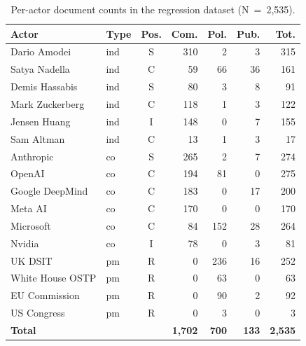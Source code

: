 \documentclass[11pt,a4paper,twocolumn]{article}
\begin{document}
\begin{table}[h]
\centering
\caption{Per-actor document counts in the regression dataset (N~=~2,535).}
\label{tab:actors}
\small
\setlength{\tabcolsep}{3.5pt}
\begin{tabular}{llcrrrr}
\toprule
\textbf{Actor} & \textbf{Type} & \textbf{Pos.} &
  \textbf{Com.} & \textbf{Pol.} & \textbf{Pub.} & \textbf{Tot.} \\
\midrule
Dario Amodei    & ind & S & 310 &   2 &  3 & 315 \\
Satya Nadella   & ind & C &  59 &  66 & 36 & 161 \\
Demis Hassabis  & ind & S &  80 &   3 &  8 &  91 \\
Mark Zuckerberg & ind & C & 118 &   1 &  3 & 122 \\
Jensen Huang    & ind & I & 148 &   0 &  7 & 155 \\
Sam Altman      & ind & C &  13 &   1 &  3 &  17 \\
\midrule
Anthropic       & co  & S & 265 &   2 &  7 & 274 \\
OpenAI          & co  & C & 194 &  81 &  0 & 275 \\
Google DeepMind & co  & C & 183 &   0 & 17 & 200 \\
Meta AI         & co  & C & 170 &   0 &  0 & 170 \\
Microsoft       & co  & C &  84 & 152 & 28 & 264 \\
Nvidia          & co  & I &  78 &   0 &  3 &  81 \\
\midrule
UK DSIT         & pm  & R &   0 & 236 & 16 & 252 \\
White House OSTP& pm  & R &   0 &  63 &  0 &  63 \\
EU Commission   & pm  & R &   0 &  90 &  2 &  92 \\
US Congress     & pm  & R &   0 &   3 &  0 &   3 \\
\midrule
\textbf{Total}  & & &
  \textbf{1,702} & \textbf{700} & \textbf{133} & \textbf{2,535} \\
\bottomrule
\end{tabular}
\end{table}
\end{document}
